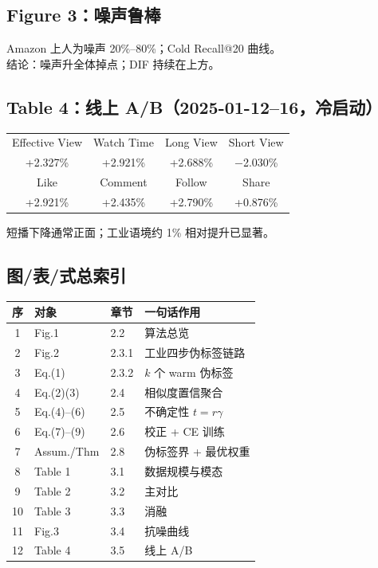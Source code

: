 \documentclass[11pt,a4paper]{ctexart}
\begin{document}
\subsection{Figure 3：噪声鲁棒}
Amazon 上人为噪声 20\%--80\%；Cold Recall@20 曲线。\\
结论：噪声升全体掉点；DIF 持续在上方。

\subsection{Table 4：线上 A/B（2025-01-12--16，冷启动）}
\begin{center}
\small
\begin{tabular}{cccc}
\toprule
Effective View & Watch Time & Long View & Short View \\
+2.327\% & +2.921\% & +2.688\% & $-$2.030\% \\
\midrule
Like & Comment & Follow & Share \\
+2.921\% & +2.435\% & +2.790\% & +0.876\% \\
\bottomrule
\end{tabular}
\end{center}
短播下降通常正面；工业语境约 1\% 相对提升已显著。

\subsection{图/表/式总索引}
\begin{center}
\small
\begin{tabular}{cllp{6.2cm}}
\toprule
序 & 对象 & 章节 & 一句话作用 \\
\midrule
1 & Fig.1 & 2.2 & 算法总览 \\
2 & Fig.2 & 2.3.1 & 工业四步伪标签链路 \\
3 & Eq.(1) & 2.3.2 & $k$ 个 warm 伪标签 \\
4 & Eq.(2)(3) & 2.4 & 相似度置信聚合 \\
5 & Eq.(4)--(6) & 2.5 & 不确定性 $t=r\gamma$ \\
6 & Eq.(7)--(9) & 2.6 & 校正 + CE 训练 \\
7 & Assum./Thm & 2.8 & 伪标签界 + 最优权重 \\
8 & Table 1 & 3.1 & 数据规模与模态 \\
9 & Table 2 & 3.2 & 主对比 \\
10 & Table 3 & 3.3 & 消融 \\
11 & Fig.3 & 3.4 & 抗噪曲线 \\
12 & Table 4 & 3.5 & 线上 A/B \\
\bottomrule
\end{tabular}
\end{center}
\end{document}
